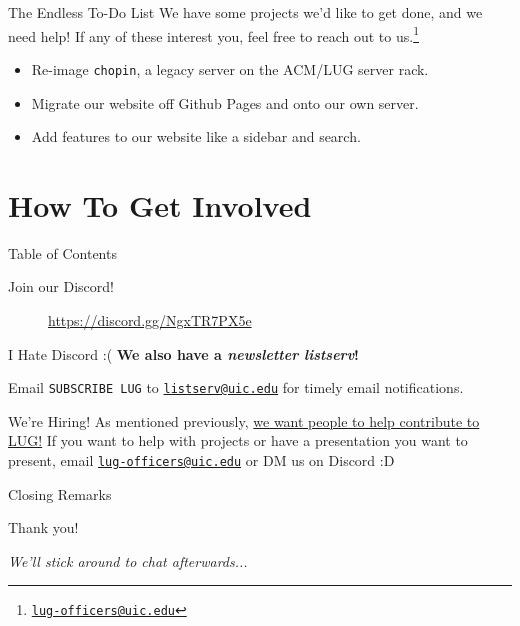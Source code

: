 \documentclass{beamer}
\begin{document}
\begin{frame}{The Endless To-Do List}
	We have some projects we'd like to get done, and we need help! If any
	of these interest you, feel free to reach out to us.\footnote{
		\href{mailto:lug-officers@uic.edu}{\texttt{lug-officers@uic.edu}}}
	\pause

	\begin{itemize}
		\item Re-image \texttt{chopin}, a legacy server on the ACM/LUG
		      server rack.
		\item Migrate our website off Github Pages and onto our own
		      server.
		\item Add features to our website like a sidebar and search.
	\end{itemize}
\end{frame}

\section{How To Get Involved}
\begin{frame}{Table of Contents}
	\tableofcontents[currentsection]
\end{frame}

\begin{frame}{Join our Discord!}
	\begin{figure}
		\centering
		
		\caption{\url{https://discord.gg/NgxTR7PX5e}}
	\end{figure}
\end{frame}

\begin{frame}{I Hate Discord \>:(}
	\textbf{We also have a \textit{newsletter listserv}!}

	Email \texttt{SUBSCRIBE LUG} to
	\href{mailto:listserv@uic.edu}{\texttt{listserv@uic.edu}} for timely
	email notifications.

\end{frame}

\begin{frame}{We're Hiring!}
	As mentioned previously, \underline{we want people to help contribute
		to LUG!} \pause If you want to help with projects or have a
	presentation you want to present, email
	\href{mailto:lug-officers@uic.edu}{\texttt{lug-officers@uic.edu}} or DM
	us on Discord :D
\end{frame}

\begin{frame}{Closing Remarks}
	\begin{center}
		{\Huge Thank you!}

		\textit{We'll stick around to chat afterwards...}
	\end{center}
\end{frame}
\end{document}

